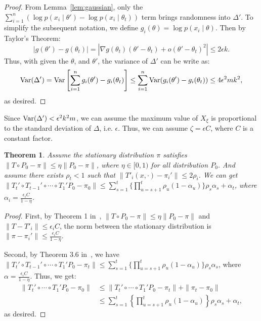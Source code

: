 \documentclass{article}
\newtheorem{theorem}{Theorem}
\begin{document}
\begin{proof}
From Lemma~\ref{lem:gaussian}, only the $\sum_{i=1}^n (\log p(x_i\mid \theta') - \log p(x_i\mid
\theta_t))$ term brings randomness into $\Delta'$. To simplify the subsequent notation, we define
$g_i(\theta) = \log p(x_i\mid \theta)$. Then by Taylor's Theorem:
\[
|g(\theta') - g(\theta_t)| = |\nabla g(\theta_t) (\theta' - \theta_t) + o(\theta' - \theta_t)^2| \leq 2\epsilon k.
\]
Thus, with given the $\theta$, and $\theta'$, the variance of $\Delta'$ can be write as:
\[
{\rm Var}(\Delta') = {\rm Var}\left[\sum_{i=1}^n g_i(\theta') - g_i(\theta_t)\right] \leq
\sum_{i=1}^n  {\rm Var}(g_i(\theta') - g_i(\theta_t)) \leq  4\epsilon^2 m k^2,
\]
as desired.
\end{proof}

Since ${\rm Var}(\Delta') < \epsilon^2 k^2 m $, we can assume the maximum value of $X_{\xi}$ is
proportional to the standard deviation of $\Delta$, i.e. $\epsilon$. Thus, we can assume
$\zeta=\epsilon C$, where $C$ is a constant factor.

\begin{theorem}
Assume the stationary distribution $\pi$ satisfies $\|T \circ P_0 - \pi\| \leq \eta \|P_0 - \pi\|$,
where $\eta \in [0, 1)$ for all distribution $P_0$. And assume there exists $\rho_t < 1$ such that
$\|T'_i(x, \cdot) - \pi_i'\| \leq 2\rho_i$. We can get $\| T_t' \circ T_{t-1}' \circ \cdots \circ T_1' P_0
- \pi_0 \| \leq \sum_{s=1}^t \{\prod _{u=s+1}^t \rho_u (1-\alpha_u)\} \rho_s \alpha_s + \alpha_t $,
where $\alpha_i = \frac{\epsilon_i C }{1-\eta}$.
\end{theorem}

\begin{proof}
First, by Theorem 1 in~\cite{cutting_mh_2014}, $\|T \circ P_0 - \pi\| \leq \eta \|P_0
- \pi\|$ and $\|T-T'_i\| \leq \epsilon_i C$, the norm between the stationary distribution is $\|\pi
- \pi_i'\|\leq \frac{\epsilon_i C}{1-\eta}$.

Second, by Theorem 3.6 in~\cite{yang2013sequential}, we have  $\| T_t' \circ T_{t-1}' \circ \cdots
\circ T_1' P_0 - \pi_t \| \leq \sum_{s=1}^t \{\prod _{u=s+1}^t \rho_u (1-\alpha_u)\} \rho_s
\alpha_s$, where $\alpha = \frac{\epsilon_i C}{1-\eta}$. Thus, we get:
\begin{align*}
 \| T_t' \circ \cdots \circ T_1' P_0 - \pi_0 \| &\leq \|T_t' \circ \cdots \circ T_1' P_0 - \pi_t\| + \|\pi_t - \pi_0\| \\
 &\leq \sum_{s=1}^t \left\{\prod _{u=s+1}^t \rho_u (1-\alpha_u)\right\} \rho_s \alpha_s + \alpha_t,
\end{align*}
as desired.
\end{proof}
\end{document}
